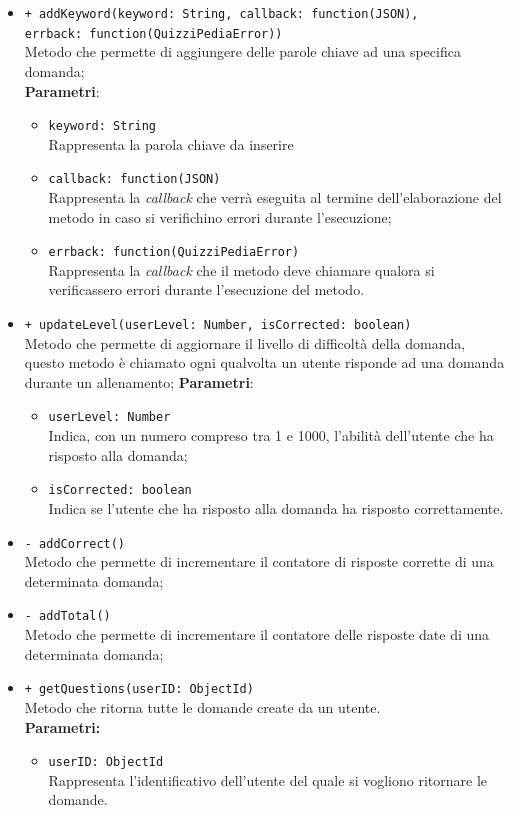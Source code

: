\begin{itemize}
\begin{itemize}
\begin{itemize}
		\end{itemize}
	\item \texttt{+ addKeyword(keyword: String, callback: function(JSON),\\ errback: function(QuizziPediaError))} \\
	Metodo che permette di aggiungere delle parole chiave ad una specifica domanda; \\
		\textbf{Parametri}:
			 \begin{itemize}
			 	\item \texttt{keyword: String} \\
			 	Rappresenta la parola chiave da inserire
			 	\item \texttt{callback: function(JSON)} \\
			 	Rappresenta la \textit{callback} che verrà eseguita al termine dell'elaborazione del metodo in caso si verifichino errori durante l'esecuzione;
			 	\item \texttt{errback: function(QuizziPediaError)} \\
			 	Rappresenta la \textit{callback} che il metodo deve chiamare qualora si verificassero errori durante l'esecuzione del metodo.
			 \end{itemize}
	\item \texttt{+ updateLevel(userLevel: Number, isCorrected: boolean)} \\
	Metodo che permette di aggiornare il livello di difficoltà della domanda, questo metodo è chiamato ogni qualvolta un utente risponde ad una domanda durante un allenamento;
		\textbf{Parametri}:
			\begin{itemize}
				\item \texttt{userLevel: Number} \\
				Indica, con un numero compreso tra 1 e 1000, l'abilità dell'utente che ha risposto alla domanda;
				\item \texttt{isCorrected: boolean} \\
				Indica se l'utente che ha risposto alla domanda ha risposto correttamente.
			\end{itemize}  
	\item \texttt{- addCorrect()} \\
	Metodo che permette di incrementare il contatore di risposte corrette di una determinata domanda;
	\item \texttt{- addTotal()} \\
	Metodo che permette di incrementare il contatore delle risposte date di una determinata domanda;
	\item \texttt{+ getQuestions(userID: ObjectId)}\\
	Metodo che ritorna tutte le domande create da un utente.\\
	\textbf{Parametri:}
	\begin{itemize}
		\item \texttt{userID: ObjectId}\\
		Rappresenta l'identificativo dell'utente del quale si vogliono ritornare le domande.
	\end{itemize}
	\end{itemize}
\end{itemize}
